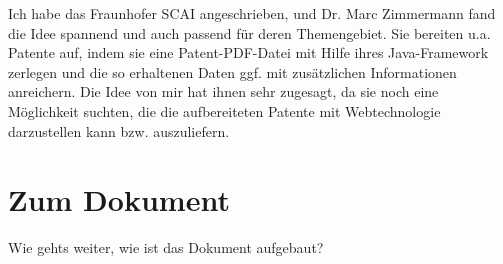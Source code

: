 Ich habe das Fraunhofer SCAI angeschrieben, und Dr. Marc Zimmermann fand
die Idee spannend und auch passend für deren Themengebiet. Sie bereiten u.a.
Patente auf, indem sie eine Patent-PDF-Datei mit Hilfe ihres Java-Framework
zerlegen und die so erhaltenen Daten ggf. mit zusätzlichen Informationen
anreichern. Die Idee von mir hat ihnen sehr zugesagt, da sie noch eine
Möglichkeit suchten, die die aufbereiteten Patente mit Webtechnologie
darzustellen kann bzw. auszuliefern.

\section{Zum Dokument}

Wie gehts weiter, wie ist das Dokument aufgebaut?
